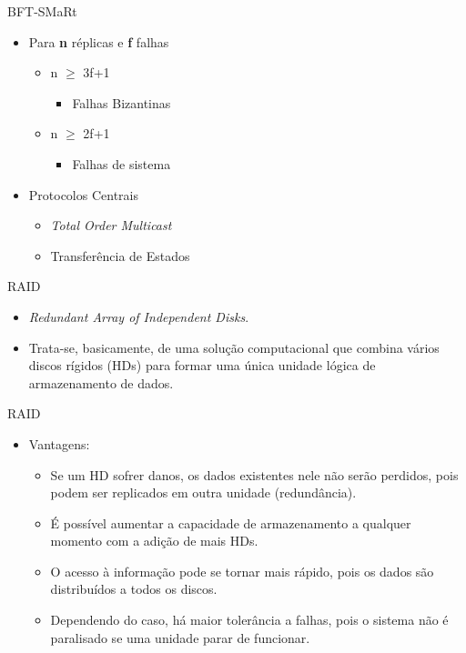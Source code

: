 \begin{frame}{BFT-SMaRt}
	\begin{itemize}
		\item Para \textbf{n} réplicas e \textbf{f} falhas
		\begin{itemize}
			\item n $\geq$ 3f+1
			\begin{itemize}
				\item Falhas Bizantinas
			\end{itemize}
			\item n $\geq$ 2f+1
			\begin{itemize}
				\item Falhas de sistema
			\end{itemize}
		\end{itemize}
		\item Protocolos Centrais
		\begin{itemize}
			\item \textit{Total Order Multicast}	
			\item Transferência de Estados
		\end{itemize}
		
	\end{itemize}
\end{frame}

\begin{frame}{RAID}
	
	\begin{itemize}
		\item \textit{Redundant Array of Independent Disks}.
		\item Trata-se, basicamente, de uma solução computacional que combina vários discos rígidos (HDs) para formar uma única unidade lógica de armazenamento de dados.
	\end{itemize}
\end{frame}

\begin{frame}{RAID}
	
	\begin{itemize}
		\item Vantagens:
		\begin{itemize}
			\item Se um HD sofrer danos, os dados existentes nele não serão perdidos, pois podem ser replicados em outra unidade (redundância).
			\item É possível aumentar a capacidade de armazenamento a qualquer momento com a adição de mais HDs.
			\item O acesso à informação pode se tornar mais rápido, pois os dados são distribuídos a todos os discos.
			\item Dependendo do caso, há maior tolerância a falhas, pois o sistema não é paralisado se uma unidade parar de funcionar.
		\end{itemize}
	\end{itemize}
\end{frame}

